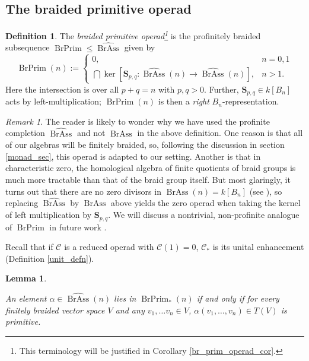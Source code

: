 \documentclass[12pt]{article}
\DeclareMathOperator{\BrAss}{BrAss}
\DeclareMathOperator{\BrPrim}{BrPrim}
\newcommand{\BrAsshat}{\widehat{\BrAss}} %
\newcommand{\CC} {\mathcal{C}}
\newcommand{\bS} {\mathbf{S}}
\theoremstyle{plain}
\newtheorem{lem}[thm]{Lemma}
\theoremstyle{definition}
\newtheorem{defn}[thm]{Definition}
\theoremstyle{remark}
\newtheorem{rem}[thm]{Remark}
\begin{document}
\subsection{The braided primitive operad} \label{br_prim_section}

\begin{defn}

The \emph{braided primitive operad\footnote{This terminology will be justified in Corollary \ref{br_prim_operad_cor}.}} is the profinitely braided subsequence $\BrPrim \leq \BrAsshat$ given by
%
$$\BrPrim(n) := \left\{\begin{array}{ll}
0, & n=0, 1\\
\bigcap \ker[\bS_{p,q}: \BrAsshat(n) \to \BrAsshat(n)], & n>1. 
\end{array} \right.$$
%
Here the intersection is over all $p+q=n$ with $p, q>0$.  Further, $\bS_{p,q} \in k[B_n]$ acts by left-multiplication; $\BrPrim(n)$ is then a \emph{right} $B_n$-representation.  

\end{defn}

\begin{rem}

The reader is likely to wonder why we have used the profinite completion $\BrAsshat$ and not $\BrAss$ in the above definition.  One reason is that all of our algebras will be finitely braided, so, following the discussion in section \ref{monad_sec}, this operad is adapted to our setting.  Another is that in characteristic zero, the homological algebra of finite quotients of braid groups is much more tractable than that of the braid group itself.  But most glaringly, it turns out that there are no zero divisors in $\BrAss(n) = k[B_n]$ (see \cite{rolfzen_zhu}), so replacing $\BrAsshat$ by $\BrAss$ above yields the zero operad when taking the kernel of left multiplication by $\bS_{p,q}$.  We will discuss a nontrivial, non-profinite analogue of $\BrPrim$ in future work \cite{braided_operads}.

\end{rem}

Recall that if $\CC$ is a reduced operad with $\CC(1) = 0$, $\CC_*$ is its unital enhancement (Definition \ref{unit_defn}).

\begin{lem} \label{prim_tensor_lemma}

An element $\alpha \in \BrAsshat(n)$ lies in $\BrPrim_*(n)$ if and only if for every finitely braided vector space $V$ and any $v_1, \dots v_n \in V$, $\alpha(v_1, \dots, v_n) \in T(V)$ is primitive. 

\end{lem}
\end{document}
